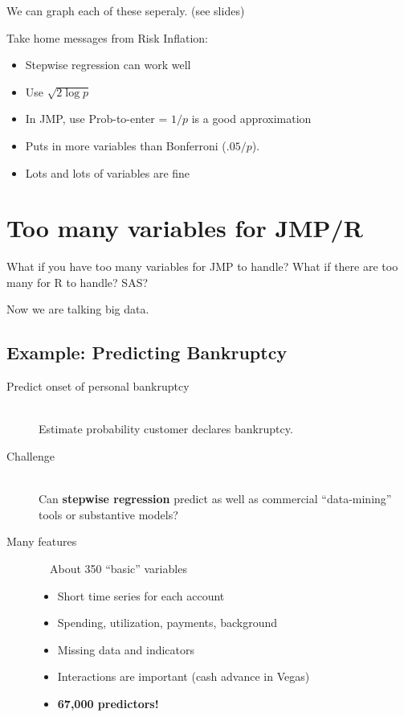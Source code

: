 \documentclass[20pt]{extarticle} %
\begin{document}
We can graph each of these seperaly.  (see slides)

\newpage

Take home messages from Risk Inflation:
\begin{itemize}
\item Stepwise regression can work well
\item Use $\sqrt{2 \log p}$ 
\item In JMP, use Prob-to-enter = $1/p$ is a good approximation
\item Puts in more variables than Bonferroni ($.05/p$).
\item Lots and lots of variables are fine
\end{itemize}
\newpage
\section{Too many variables for JMP/R}

What if you have too many variables for JMP to handle?  What if there
are too many for R to handle?  SAS?  

Now we are talking big data.
\newpage
\subsection{Example: Predicting Bankruptcy  }
\begin{description}

\item[ Predict onset of personal bankruptcy ] \ \\
  Estimate probability customer declares bankruptcy.
  
\item[Challenge] \ \\
  Can {\bf stepwise regression} predict as well as
  commercial ``data-mining'' tools or substantive models?

\item[ Many features ] \ \  About 350 ``basic'' variables
  \begin{itemize}
      \item Short time series for each account
      \item Spending, utilization, payments, background
      \item Missing data and indicators
      \item Interactions are important (cash advance in Vegas)
      \item {\bf 67,000 predictors!}
  \end{itemize}
\end{description}
\end{document}
